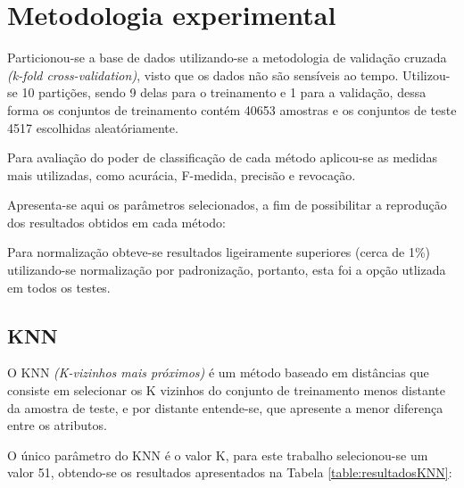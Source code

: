 \section{Metodologia experimental}

Particionou-se a base de dados utilizando-se a metodologia de validação cruzada \emph{(k-fold cross-validation)}, visto que os dados não são sensíveis ao tempo. Utilizou-se 10 partições, sendo 9 delas para o treinamento e 1 para a validação, dessa forma os conjuntos de treinamento contém 40653 amostras e os conjuntos de teste 4517 escolhidas aleatóriamente.

Para avaliação do poder de classificação de cada método aplicou-se as medidas mais utilizadas, como acurácia, F-medida, precisão e revocação.

Apresenta-se aqui os parâmetros selecionados, a fim de possibilitar a reprodução dos resultados obtidos em cada método:

Para normalização obteve-se resultados ligeiramente superiores (cerca de 1\%) utilizando-se normalização por padronização, portanto, esta foi a opção utlizada em todos os testes.

\subsection{KNN}

O KNN \emph{(K-vizinhos mais próximos)} é um método baseado em distâncias que consiste em selecionar os K vizinhos do conjunto de treinamento menos distante da amostra de teste, e por distante entende-se, que apresente a menor diferença entre os atributos.

O único parâmetro do KNN é o valor K, para este trabalho selecionou-se um valor 51, obtendo-se os resultados apresentados na Tabela \ref{table:resultadosKNN}:


